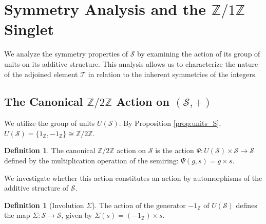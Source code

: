 \documentclass[11pt, a4paper]{article}
\theoremstyle{plain}
\theoremstyle{definition}
\newtheorem{definition}[theorem]{Definition}
\numberwithin{equation}{section}
\newcommand{\Z}{\mathbb{Z}}
\newcommand{\Tobj}{\mathcal{T}} %
\newcommand{\SemiringS}{\mathcal{S}}
\newcommand{\Ztwo}{\mathbb{Z}/2\mathbb{Z}}
\newcommand{\Zone}{\mathbb{Z}/1\mathbb{Z}}
\begin{document}
\section{Symmetry Analysis and the \texorpdfstring{$\Zone$}{Z/1Z} Singlet}

We analyze the symmetry properties of $\SemiringS$ by examining the action of its group of units on its additive structure. This analysis allows us to characterize the nature of the adjoined element $\Tobj$ in relation to the inherent symmetries of the integers.

\subsection{The Canonical \texorpdfstring{$\Ztwo$}{Z/2Z} Action on \texorpdfstring{$(\SemiringS, +)$}{(S, +)}}

We utilize the group of units $U(\SemiringS)$. By Proposition \ref{prop:units_S}, $U(\SemiringS) = \{1_{\Z}, -1_{\Z}\} \cong \Ztwo$.

\begin{definition}
The canonical $\Ztwo$ action on $\SemiringS$ is the action $\Psi: U(\SemiringS) \times \SemiringS \to \SemiringS$ defined by the multiplication operation of the semiring: $\Psi(g, s) = g \times s$.
\end{definition}

We investigate whether this action constitutes an action by automorphisms of the additive structure of $\SemiringS$.

\begin{definition}[Involution $\Sigma$]
The action of the generator $-1_{\Z}$ of $U(\SemiringS)$ defines the map $\Sigma: \SemiringS \to \SemiringS$, given by $\Sigma(s) = (-1_{\Z}) \times s$.
\end{definition}
\end{document}
